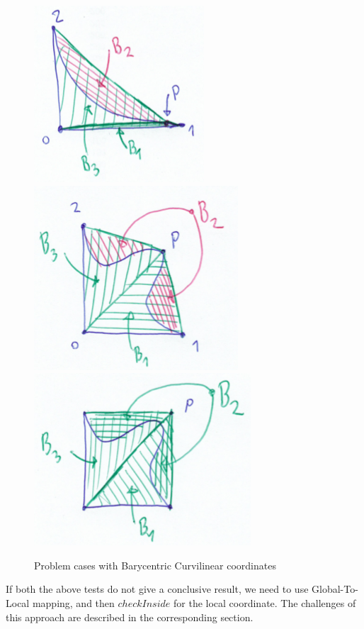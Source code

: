 \documentclass[12pt]{article}
\begin{document}
\begin{figure}[!htb]
    \centering	
    \includegraphics[scale=0.7]{doc-pics/pic-barycentric-problem-1.png}
    \includegraphics[scale=0.7]{doc-pics/pic-barycentric-problem-2.png}
    \includegraphics[scale=0.7]{doc-pics/pic-barycentric-problem-3.png}
    \caption{Problem cases with Barycentric Curvilinear coordinates}
\end{figure}

\noindent
If both the above tests do not give a conclusive result, we need to use Global-To-Local mapping, and then $checkInside$ for the local coordinate. The challenges of this approach are described in the corresponding section. \\
\end{document}
